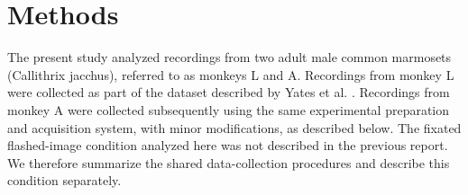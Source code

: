 \documentclass{lite}
\begin{document}


\section{Methods}

The present study analyzed recordings from two adult male common marmosets (Callithrix jacchus), referred to as monkeys L and A. Recordings from monkey L were collected as part of the dataset described by Yates et al. \cite{yates2023detailed}. Recordings from monkey A were collected subsequently using the same experimental preparation and acquisition system, with minor modifications, as described below. The fixated flashed-image condition analyzed here was not described in the previous report. We therefore summarize the shared data-collection procedures and describe this condition separately.
\end{document}
